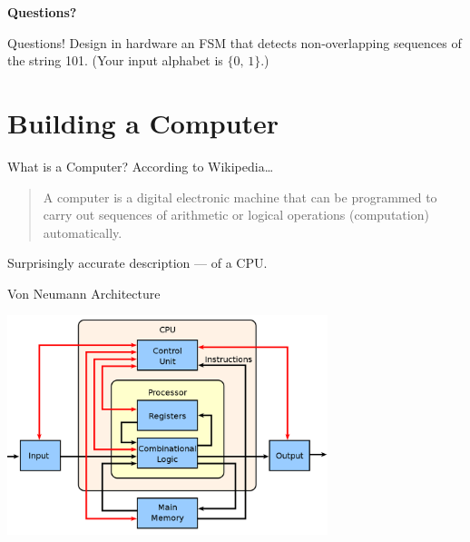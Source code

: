 \documentclass[aspectratio=169, 11pt, handout]{beamer}
\begin{document}
\begin{frame}{}
      \begin{center}
    {\color{sigma@mainblue} \bfseries\LARGE Questions?}
  \end{center}
\end{frame}

\begin{frame}{Questions!}
    Design in hardware an FSM that detects non-overlapping sequences of the string 101. (Your input alphabet is $\{0,\,1\}$.)
\end{frame}

\section{Building a Computer}
\frame{\sectionpage}


\begin{frame}{What is a Computer?}
    \pause
    According to Wikipedia\ldots
    
\begin{quote}    
   A computer is a digital electronic machine that can be programmed to carry out sequences of arithmetic or logical operations (computation) automatically. 
   \end{quote}
   
   Surprisingly accurate description --- of a CPU.
\end{frame}

\begin{frame}{Von Neumann Architecture}
    
    \begin{center}
        \includegraphics[width=0.7\textwidth]{1280px-ABasicComputer.png}
    \end{center}
\end{frame}
\end{document}
